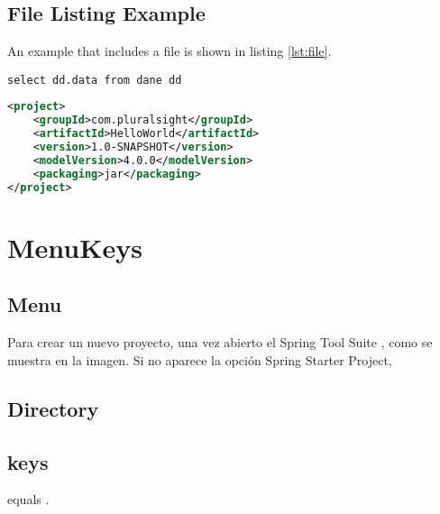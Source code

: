 	\subsection*{File Listing Example}
	
	An example that includes a  file is shown in listing \ref{lst:file}.
	
	
	
	
	
	
	
	
	
\begin{lstlisting}[caption={Some Java code},label={lst:label},style=terminal]
select dd.data from dane dd 
\end{lstlisting}
		
\begin{lstlisting}[caption={A simple listing.}, label={lst:simple}, language=XML]
<project>
	<groupId>com.pluralsight</groupId>
	<artifactId>HelloWorld</artifactId>
	<version>1.0-SNAPSHOT</version>
	<modelVersion>4.0.0</modelVersion>
	<packaging>jar</packaging>
</project>
	\end{lstlisting}
\section{MenuKeys}

	\subsection{Menu}

	Para crear un nuevo proyecto, una vez abierto el Spring Tool Suite , como se muestra en la imagen. Si no aparece la opción Spring Starter Project, 
	
	\subsection{Directory}
	
	
	\subsection{keys}
	
	 equals .
	
	
